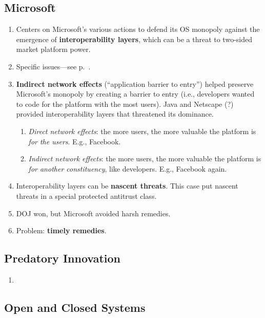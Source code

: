 \subsection{Microsoft}

\begin{enumerate}
    \item Centers on Microsoft's various actions to defend its OS monopoly 
    against the emergence of \textbf{interoperability layers}, which can be a 
    threat to two-sided market platform power.
    \item Specific issues---see p.~\pageref{sub:msft-issues}.
    \item \textbf{Indirect network effects} (``application barrier to entry'') 
    helped preserve Microsoft's monopoly by creating a barrier to entry (i.e., 
    developers wanted to code for the platform with the most users). Java and 
    Netscape (?) provided interoperability layers that threatened its 
    dominance.
    \begin{enumerate}
        \item \emph{Direct network effects}: the more users, the more valuable 
        the platform is \emph{for the users}. E.g., Facebook.
        \item \emph{Indirect network effects}: the more users, the more 
        valuable the platform is \emph{for another constituency}, like 
        developers. E.g., Facebook again.
    \end{enumerate}
    \item Interoperability layers can be \textbf{nascent threats}. This case 
    put nascent threats in a special protected antitrust class.
    \item DOJ won, but Microsoft avoided harsh remedies.
    \item Problem: \textbf{timely remedies}.
\end{enumerate}

\subsection{Predatory Innovation} %

\begin{enumerate}
    \item 
\end{enumerate}

\subsection{Open and Closed Systems} %

